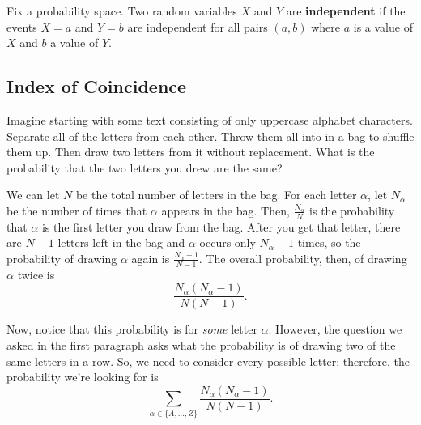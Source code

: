 \documentclass[letterpaper]{article}
\begin{document}
\begin{definition}{}{}
    Fix a probability space. Two random variables $X$ and $Y$ are \textbf{independent} if the events $X = a$ and $Y = b$ are independent for all pairs $(a, b)$ where $a$ is a value of $X$ and $b$ a value of $Y$.
\end{definition}

\subsection{Index of Coincidence}
Imagine starting with some text consisting of only uppercase alphabet characters. Separate all of the letters from each other. Throw them all into in a bag to shuffle them up. Then draw two letters from it without replacement. What is the probability that the two letters you drew are the same?

\bigskip

We can let $N$ be the total number of letters in the bag. For each letter $\alpha$, let $N_\alpha$ be the number of times that $\alpha$ appears in the bag. Then, $\frac{N_\alpha}{N}$ is the probability that $\alpha$ is the first letter you draw from the bag. After you get that letter, there are $N - 1$ letters left in the bag and $\alpha$ occurs only $N_\alpha - 1$ times, so the probability of drawing $\alpha$ again is $\frac{N_\alpha - 1}{N - 1}$. The overall probability, then, of drawing $\alpha$ twice is \[\frac{N_\alpha (N_\alpha - 1)}{N(N - 1)}.\]

Now, notice that this probability is for \emph{some} letter $\alpha$. However, the question we asked in the first paragraph asks what the probability is of drawing two of the same letters in a row. So, we need to consider every possible letter; therefore, the probability we're looking for is \[\sum_{\alpha \in \{A, \hdots, Z\}} \frac{N_\alpha (N_\alpha - 1)}{N(N - 1)}.\] 
\end{document}
